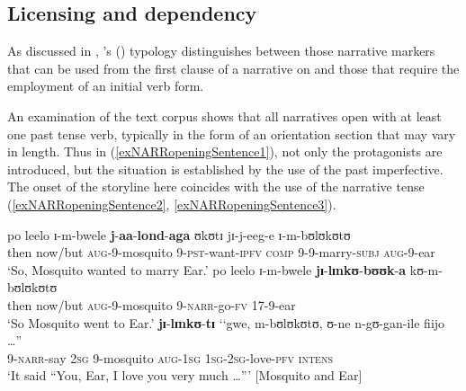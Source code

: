 \subsection{Licensing and dependency}\label{NarrativeMarkersLicensingDependency}
As discussed in , \citeauthor{LongacreR1990}'s (\citeyear{LongacreR1990}) typology distinguishes between those narrative markers that can be used from the first clause of a narrative on and those that require the employment of an initial verb form.

An examination of the text corpus shows that all narratives open with at least one past tense verb, typically in the form of an orientation section that may vary in length. Thus in (\ref{exNARRopeningSentence1}), not only the protagonists are introduced, but the situation is established by the use of the past imperfective. The onset of the storyline here coincides with the use of the narrative tense (\ref{exNARRopeningSentence2}, \ref{exNARRopeningSentence3}).

\begin{exe}
	\ex \label{exNARRopening}
	\begin{xlist}
		\ex \label{exNARRopeningSentence1} \gll po leelo ɪ-m-bwele \textbf{j}-\textbf{aa}-\textbf{lond}-\textbf{aga} ʊkʊtɪ jɪ-j-eeg-e ɪ-m-bʊlʊkʊtʊ\\
		then now/but \textsc{aug}-9-mosquito 9-\textsc{pst}-want-\textsc{ipfv} \textsc{comp} 9-9-marry-\textsc{subj} \textsc{aug}-9-ear\\
		\glt `So, Mosquito wanted to marry Ear.'
		\ex \label{exNARRopeningSentence2}\gll po leelo ɪ-m-bwele \textbf{jɪ}-\textbf{lɪnkʊ}-\textbf{bʊʊk}-\textbf{a} kʊ-m-bʊlʊkʊtʊ\\
		then now/but \textsc{aug}-9-mosquito 9-\textsc{narr}-go-\textsc{fv} 17-9-ear\\
		\glt `So Mosquito went to Ear.'
		\ex \label{exNARRopeningSentence3}\gll \textbf{jɪ}-\textbf{lɪnkʊ}-\textbf{tɪ} \textup{\lq\lq}gwe, m-bʊlʊkʊtʊ, ʊ-ne n-gʊ-gan-ile fiijo \ldots\textup{''}\\
		9-\textsc{narr}-say \phantom{\lq\lq}\textsc{2sg} 9-mosquito \textsc{aug}-\textsc{1sg} \textsc{1sg}-\textsc{2sg}-love-\textsc{pfv} \textsc{intens}\\
		\glt `It said ``You, Ear, I love you very much \ldots''{}' [Mosquito and Ear]
	\end{xlist}
\end{exe}

